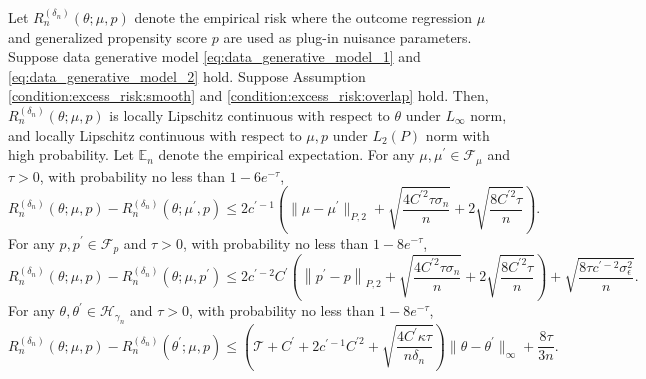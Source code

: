 \begin{lemma}\label{lemma:lipschitz_empirical_risk}
Let $R_n^{({\delta_n})}(\theta;\mu,p)$
denote the empirical risk where the outcome regression $\mu$ and generalized propensity score $p$ are used as plug-in nuisance parameters. Suppose data generative model \eqref{eq:data_generative_model_1} and \eqref{eq:data_generative_model_2} hold. Suppose Assumption \ref{condition:excess_risk:smooth} and \ref{condition:excess_risk:overlap} hold. Then, $R_n^{({\delta_n})}(\theta;\mu,p)$ is locally Lipschitz continuous with respect to $\theta$ under $L_\infty$ norm, and locally Lipschitz continuous with respect to $\mu,p$ under $L_2(P)$ norm with high probability. Let $\mathbb{E}_n$ denote the empirical expectation.  For any $\mu,\mu^\prime\in \mathcal{F}_{\mu}$ and $\tau>0$, with probability no less than $1-6e^{-\tau}$, 
$$R_n^{({\delta_n})}(\theta;\mu, p) - R_n^{({\delta_n})}(\theta;\mu^\prime, p)\leq 2c^{\prime-1}\left(\|\mu-\mu^\prime\|_{P,2} + \sqrt{\frac{4C^{\prime2}\tau\sigma_n}{n}} + 2\sqrt{\frac{8C^{\prime2}\tau}{n}}\right).$$
For any $p,p^\prime\in\mathcal{F}_p$ and $\tau>0$, with probability no less than $1-8e^{-\tau}$, 
$$R_n^{({\delta_n})}(\theta;\mu, p) - R_n^{({\delta_n})}(\theta;\mu, p^\prime)\leq 2c^{\prime-2}C^{\prime}\left(\left\|p^\prime -p\right\|_{P,2}+\sqrt{\frac{4C^{\prime2}\tau\sigma_n}{n}} + 2\sqrt{\frac{8C^{\prime2}\tau}{n}}\right)  + \sqrt{\frac{8\tau c^{\prime-2} \sigma_\epsilon^2}{n}}.$$
For any $\theta,\theta^\prime\in \mathcal{H}_{\gamma_n}$ and $\tau>0$, with probability no less than $1-8e^{-\tau}$, 
$$R_n^{({\delta_n})}(\theta;\mu,p) - R_n^{({\delta_n})}(\theta^\prime;\mu,p)\leq \left(\mathcal{T}+C^\prime+2c^{\prime-1}C^{\prime2}+\sqrt{\frac{4C^\prime \kappa \tau}{n\delta_n}}\right)\|\theta-\theta^\prime\|_{\infty} + \frac{8\tau}{3n}.$$
\end{lemma}
